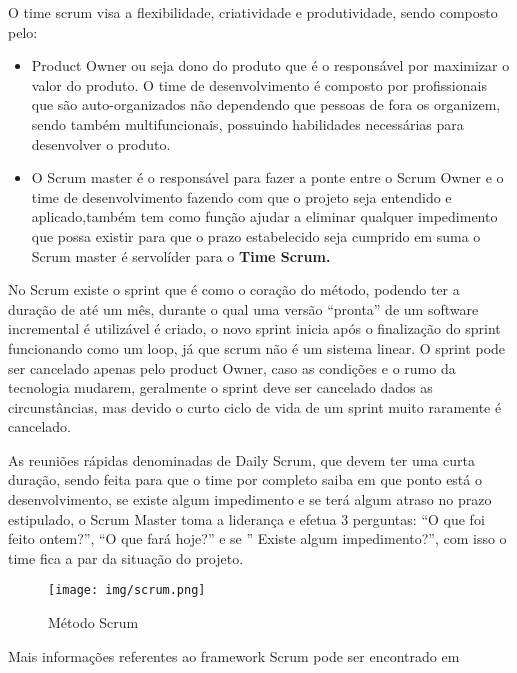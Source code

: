 \documentclass[
	12pt,				%
	oneside,			%
	a4paper,			%
  section=TITLE,
	brazil,				%
	]{abntex2}
\begin{document}
O time scrum visa a flexibilidade, criatividade e produtividade, sendo composto
pelo:

\begin{itemize}
  \item{Product Owner} ou seja dono do produto que é o responsável por
    maximizar o valor do produto. O time de desenvolvimento é composto por profissionais
    que são auto-organizados não dependendo que pessoas de fora os organizem, sendo
    também multifuncionais, possuindo habilidades necessárias para desenvolver o
    produto.
  \item{O Scrum master} é o responsável para fazer a ponte entre o Scrum
    Owner e o time de desenvolvimento fazendo com que o projeto seja entendido
    e aplicado,também tem como função ajudar a eliminar qualquer impedimento
    que possa existir para que o prazo estabelecido seja cumprido em suma o
    Scrum master é servolíder para o \bfseries{Time Scrum}.
\end{itemize}

No Scrum existe o sprint que é como o coração do método, podendo ter a duração
de até um mês, durante o qual uma versão “pronta” de um software incremental é
utilizável é criado, o novo sprint inicia após o finalização do sprint
funcionando como um loop, já que scrum não é um sistema linear. O sprint pode
ser cancelado apenas pelo product Owner, caso as condições e o rumo da
tecnologia mudarem, geralmente o sprint deve ser cancelado dados as
circunstâncias, mas devido o curto ciclo de vida de um sprint muito raramente é
cancelado.

As reuniões rápidas denominadas de Daily Scrum, que devem ter uma curta
duração, sendo feita para que o time por completo saiba em que ponto está o
desenvolvimento, se existe algum impedimento e se terá algum atraso no prazo
estipulado, o Scrum Master toma a liderança e efetua 3 perguntas: “O que foi
feito ontem?”, “O que fará hoje?” e se ” Existe algum impedimento?”, com isso o
time fica a par da situação do projeto.

\begin{figure}[htb]
\caption{\label{fig_circulo}Método Scrum}
\begin{center}
\texttt{[image: img/scrum.png]}
\end{center}
\end{figure}

Mais informações referentes ao framework Scrum pode ser encontrado em
\cite{scrum-guide}
\end{document}
